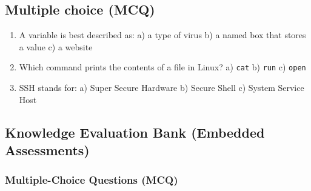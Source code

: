 \documentclass[12pt,openany]{book}
\begin{document}
\medskip

\subsection*{Multiple choice (MCQ)}


\begin{enumerate}

  \item A variable is best described as:
   a) a type of virus  b) a named box that stores a value  c) a website

  \item Which command prints the contents of a file in Linux?
   a) \texttt{cat}  b) \texttt{run}  c) \texttt{open}

  \item SSH stands for:
   a) Super Secure Hardware  b) Secure Shell  c) System Service Host

\end{enumerate}

\medskip

\subsection*{Knowledge Evaluation Bank (Embedded Assessments)}


\subsubsection*{Multiple-Choice Questions (MCQ)}
\end{document}
